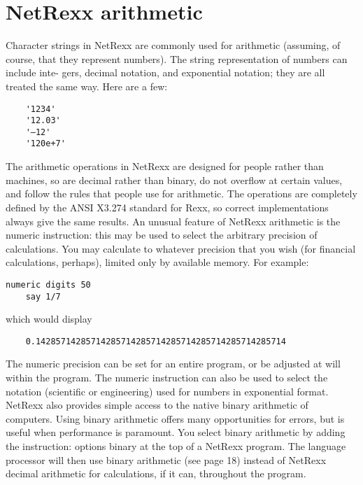\section{NetRexx arithmetic}
Character strings in NetRexx are commonly used for arithmetic
(assuming, of course, that they represent numbers). The string
representation of numbers can include inte- gers, decimal notation,
and exponential notation; they are all treated the same way. Here are
a few:
\begin{verbatim}
    '1234'
    '12.03'
    '–12'
    '120e+7'
\end{verbatim}
The arithmetic operations in NetRexx are designed for people rather than machines, so are decimal rather than binary, do not overflow at certain values, and follow the rules that people use for arithmetic. The operations are completely defined by the ANSI X3.274 standard for Rexx, so correct implementations always give the same results.
An unusual feature of NetRexx arithmetic is the numeric instruction:
this may be used to select the arbitrary precision of
calculations. You may calculate to whatever precision that you wish
(for financial calculations, perhaps), limited only by available
memory. For example:
\begin{lstlisting}[label=Digits,caption=Digits]
    numeric digits 50
    say 1/7
\end{lstlisting}
which would display
\begin{verbatim}
    0.14285714285714285714285714285714285714285714285714
\end{verbatim}
The numeric precision can be set for an entire program, or be adjusted at will within the program. The numeric instruction can also be used to select the notation (scientific or engineering) used for numbers in exponential format.
NetRexx also provides simple access to the native binary arithmetic of computers. Using binary arithmetic offers many opportunities for errors, but is useful when performance is paramount. You select binary arithmetic by adding the instruction:
    options binary
at the top of a NetRexx program. The language processor will then use binary arithmetic (see page 18) instead of NetRexx decimal arithmetic for calculations, if it can, throughout the program.
